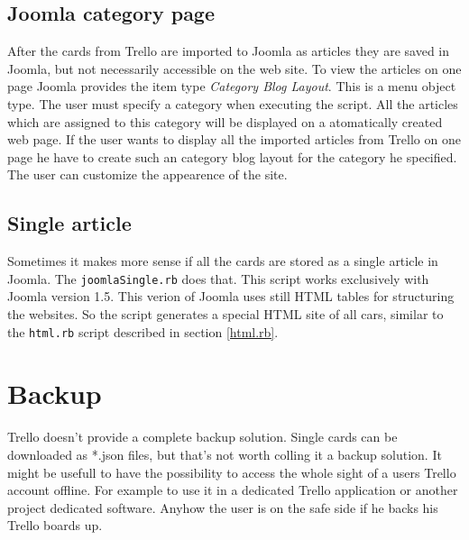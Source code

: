 \subsection{Joomla category page}

After the cards from Trello are imported to Joomla as articles they are saved in Joomla, but not necessarily accessible on the web site. To view the articles on one page Joomla provides the item type \emph{Category Blog Layout}. This is a menu object type. The user must specify a category when executing the script. All the articles which are assigned to this category will be displayed on a atomatically created web page. If the user wants to display all the imported articles from Trello on one page he have to create such an category blog layout for the category he specified. The user can customize the appearence of the site.

\subsection{Single article}
Sometimes it makes more sense if all the cards are stored as a single article in Joomla. The \texttt{joomlaSingle.rb} does that. This script works exclusively with Joomla version 1.5. This verion of Joomla uses still HTML tables for structuring the websites. So the script generates a special HTML site of all cars, similar to the \texttt{html.rb} script described in section \ref{html.rb}.




\section{Backup}

Trello doesn't provide a complete backup solution. Single cards can be downloaded as *.json files, but that's not worth colling it a backup solution. It might be usefull to have the possibility to access the whole sight of a users Trello account offline. For example to use it in a dedicated Trello application or another project dedicated software. Anyhow the user is on the safe side if he backs his Trello boards up.

